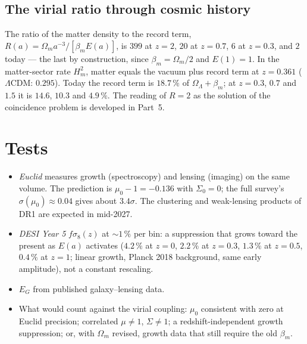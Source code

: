\subsection{The virial ratio through cosmic history}
The ratio of the matter density to the record term, $R(a)=\Omega_ma^{-3}/[\beta_mE(a)]$, is $399$ at $z=2$, $20$ at $z=0.7$, $6$ at $z=0.3$, and $2$
today --- the last by construction, since $\beta_m=\Omega_m/2$ and $E(1)=1$. In the matter-sector rate $H_m^2$, matter equals the vacuum plus record term at $z=0.361$ ($\Lambda$CDM:
$0.295$). Today the record term is $18.7\,\%$ of $\Omega_\Lambda+\beta_m$; at $z=0.3$, $0.7$ and $1.5$ it is $14.6$, $10.3$ and $4.9\,\%$. The reading of
$R=2$ as the solution of the coincidence problem is developed in Part~5.

\section{Tests}
\begin{itemize}
\item \emph{Euclid} measures growth (spectroscopy) and lensing (imaging) on the same volume. The prediction is $\mu_0-1=-0.136$ with $\Sigma_0=0$; the
full survey's $\sigma(\mu_0)\approx0.04$ gives about $3.4\sigma$. The clustering and weak-lensing products of DR1 are expected in mid-2027.
\item \emph{DESI Year 5} $f\sigma_8(z)$ at $\sim1\,\%$ per bin: a suppression that grows toward the present as $E(a)$ activates ($4.2\,\%$ at $z=0$,
$2.2\,\%$ at $z=0.3$, $1.3\,\%$ at $z=0.5$, $0.4\,\%$ at $z=1$; linear growth, Planck 2018 background, same early amplitude), not a constant rescaling.
\item $E_G$ from published galaxy--lensing data.
\item What would count against the virial coupling: $\mu_0$ consistent with zero at Euclid precision; correlated $\mu\neq1$, $\Sigma\neq1$; a
redshift-independent growth suppression; or, with $\Omega_m$ revised, growth data that still require the old $\beta_m$.
\end{itemize}

